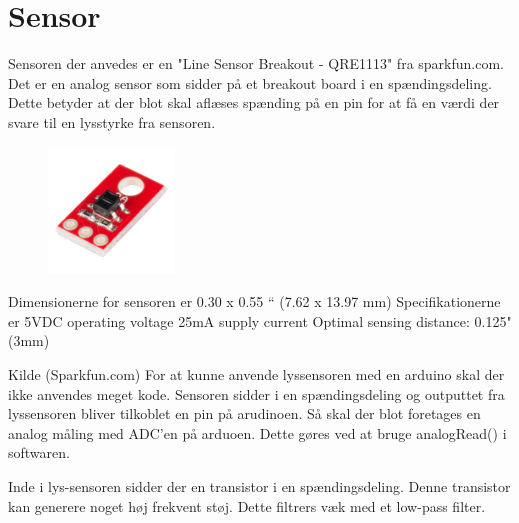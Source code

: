 \section{Sensor}
Sensoren der anvedes er en "Line Sensor Breakout - QRE1113" fra sparkfun.com. Det er en analog sensor som sidder på et breakout board i en spændingsdeling. Dette betyder at der blot skal aflæses spænding på en pin for at få en værdi der svare til en lysstyrke fra sensoren.

\begin{figure}[h!]
  \centering
  \includegraphics[width=0.3\textwidth]{figures/lyssensor.png}
\end{figure}

Dimensionerne for sensoren er 0.30 x 0.55 “ (7.62 x 13.97 mm) 
\newline
Specifikationerne er  
\newline
5VDC operating voltage
25mA supply current
Optimal sensing distance: 0.125" (3mm)

Kilde (Sparkfun.com)
\newline
For at kunne anvende lyssensoren med en arduino skal der ikke anvendes meget kode. Sensoren sidder i en spændingsdeling og outputtet fra lyssensoren bliver tilkoblet en pin på arudinoen. Så skal der blot foretages en analog måling med ADC'en på arduoen. 
Dette gøres ved at bruge analogRead() i softwaren.
\newline

Inde i lys-sensoren sidder der en transistor i en spændingsdeling. Denne transistor kan generere noget høj frekvent støj. Dette filtrers væk med et low-pass filter.